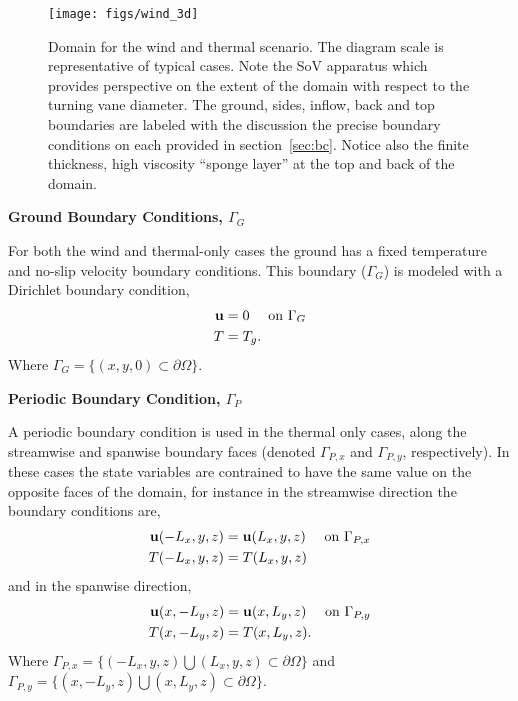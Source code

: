 \begin{figure}[!htb]
  \begin{center}
   \texttt{[image: figs/wind\_3d]}
    \caption{Domain for the wind and thermal scenario. The diagram scale
   is representative of typical cases. Note the SoV apparatus which
   provides perspective on the extent of the domain with respect to the
   turning vane diameter. The ground, sides, inflow, back and top
   boundaries are labeled with the discussion the precise boundary
   conditions on each provided in section~\ref{sec:bc}. Notice also the
   finite thickness, high viscosity ``sponge layer'' at the top and back
   of the domain.}   
    \label{fig:wind3d}
  \end{center}
\end{figure}

\textbf{Ground Boundary Conditions, $\Gamma_G$} 

For both the wind and thermal-only cases the ground has a fixed
temperature and no-slip velocity boundary conditions. This boundary 
($\Gamma_G$) is modeled with a Dirichlet boundary condition, 
\begin{align}
 {\bf u} &= 0 \quad \text{ on } \Gamma_G \\
 T &= T_g.
\end{align}
Where $\Gamma_G = \{(x,y,0) \subset \partial \Omega \} $. 

%
%
%
\textbf{Periodic Boundary Condition, $\Gamma_P$} 

A periodic boundary condition is used in the thermal only cases, 
along the streamwise and spanwise boundary faces 
(denoted $\Gamma_{P,x}$ and $\Gamma_{P,y}$, respectively). In these
cases the state variables  
are contrained to have the same value on the opposite faces of the domain, 
for instance in the streamwise direction the boundary conditions are, 
\begin{align}
 {\bf u}(-L_x,y,z) &= {\bf u}(L_x,y,z) \quad \text{ on } \Gamma_{P,x} \\
 T(-L_x,y,z) &= T(L_x,y,z)
\end{align}
and in the spanwise direction,
\begin{align}
 {\bf u}(x,-L_y,z) &= {\bf u}(x,L_y,z) \quad \text{ on } \Gamma_{P,y} \\
 T(x,-L_y,z) &= T(x,L_y,z). 
\end{align}
Where $\Gamma_{P,x} = \{(-L_x,y,z) \bigcup (L_x,y,z) \subset \partial
\Omega \}$  
and $\Gamma_{P,y} = \{(x,-L_y,z) \bigcup (x,L_y,z) \subset \partial
\Omega \}$. 

